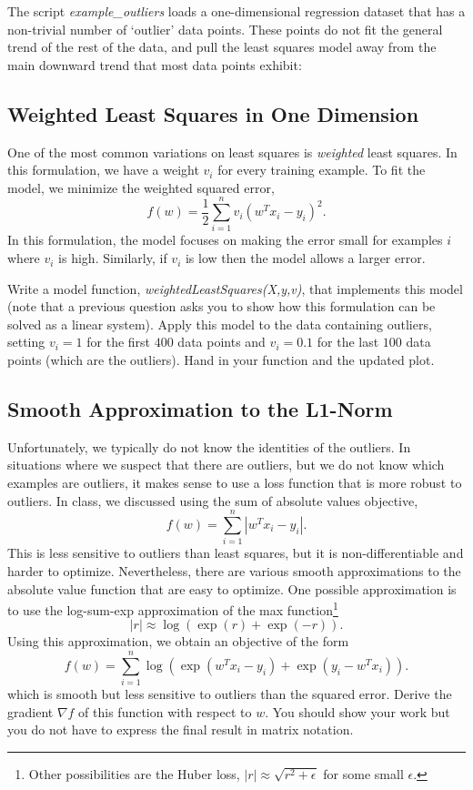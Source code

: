 \documentclass{article}
\def\blu#1{{\color{blu}#1}}
\newcommand{\centerfig}[2]{\begin{center}\texttt{[image: a2f/\#2]}\end{center}}
\begin{document}
The script \emph{example\_outliers} loads a one-dimensional regression dataset that has a non-trivial number of `outlier' data points. These points do not fit the general trend of the rest of the data, and pull the least squares model away from the main downward trend that most data points exhibit:




\subsection{Weighted Least Squares in One Dimension}

One of the most common variations on least squares is \emph{weighted} least squares. In this formulation, we have a weight $v_i$ for every training example. To fit the model, we minimize the weighted squared error,
\[
f(w) =  \frac{1}{2}\sum_{i=1}^n v_i(w^Tx_i - y_i)^2.
\]
In this formulation, the model focuses on making the error small for examples $i$ where $v_i$ is high. Similarly, if $v_i$ is low then the model allows a larger error.

Write a model function, \emph{weightedLeastSquares(X,y,v)}, that implements this model (note that a previous question asks you to show how this formulation can be solved as a linear system).
Apply this model to the data containing outliers, setting $v_i = 1$ for the first $400$ data points and $v_i = 0.1$ for the last $100$ data points (which are the outliers). \blu{Hand in your function and the updated plot}.


\subsection{Smooth Approximation to the L1-Norm}

Unfortunately, we typically do not know the identities of the outliers. In situations where we suspect that there are outliers, but we do not know which examples are outliers, it makes sense to use a loss function that is more robust to outliers. In class, we discussed using the sum of absolute values objective,
\[
f(w) = \sum_{i=1}^n |w^Tx_i - y_i|.
\]
This is less sensitive to outliers than least squares, but it is non-differentiable and harder to optimize. Nevertheless, there are various smooth approximations to the absolute value function that are easy to optimize. One possible approximation is to use the log-sum-exp approximation of the max function\footnote{Other possibilities are the Huber loss, $|r| \approx \sqrt{r^2 + \epsilon}$ for some small $\epsilon$.}
\[
|r| \approx \log(\exp(r) + \exp(-r)).
\]
Using this approximation, we obtain an objective of the form
\[
f(w) = \sum_{i=1}^n  \log\left(\exp(w^Tx_i - y_i) + \exp(y_i - w^Tx_i)\right).
\]
which is smooth but less sensitive to outliers than the squared error. \blu{Derive
 the gradient $\nabla f$ of this function with respect to $w$. You should show your work but you do not have to express the final result in matrix notation.}
\end{document}
